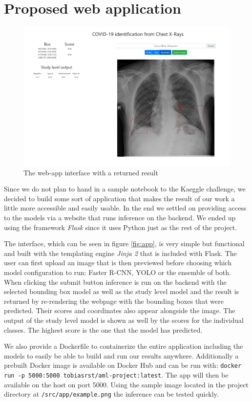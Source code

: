 \chapter{Proposed web application}\label{chapter:webapp}

\begin{figure}[h!]
	\centering
	\includegraphics[width=0.9\linewidth]{img/app.png}
	\caption{The web-app interface with a returned result}
	\label{fig:app}
\end{figure}

Since we do not plan to hand in a sample notebook to the Kaeggle challenge, we decided to build some sort of application that makes the result of our work a little more accessible and easily usable. In the end we settled on providing access to the models via a website that runs inference on the backend. We ended up using the framework \textit{Flask} \autocite{ronacher_flask_nodate} since it uses Python just as the rest of the project.

The interface, which can be seen in figure \vref{fig:app}, is very simple but functional and built with the templating engine \textit{Jinja 2} that is included with Flask. The user can first upload an image that is then previewed before choosing which model configuration to run: Faster \ac{R-CNN}, \ac{YOLO} or the ensemble of both. When clicking the submit button inference is run on the backend with the selected bounding box model as well as the study level model and the result is returned by re-rendering the webpage with the bounding boxes that were predicted. Their scores and coordinates also appear alongside the image. The output of the study level model is shown as well by the scores for the individual classes. The highest score is the one that the model has predicted.

We also provide a Dockerfile to containerize the entire application including the models to easily be able to build and run our results anywhere. Additionally a prebuilt Docker image is available on Docker Hub and can be run with: \texttt{docker run -p 5000:5000 tobiasrst/aml-project:latest}. The app will then be available on the host on port 5000. Using the sample image located in the project directory at \texttt{/src/app/example.png} the inference can be tested quickly.
